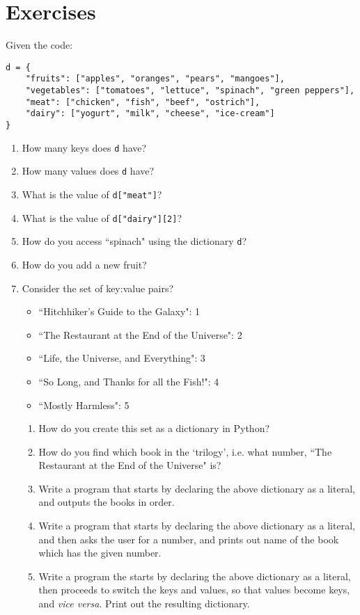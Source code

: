 \section{Exercises}

Given the code:
\begin{lstlisting}
d = {
    "fruits": ["apples", "oranges", "pears", "mangoes"],
    "vegetables": ["tomatoes", "lettuce", "spinach", "green peppers"],
    "meat": ["chicken", "fish", "beef", "ostrich"],
    "dairy": ["yogurt", "milk", "cheese", "ice-cream"]
}\end{lstlisting}
\begin{enumerate}
	\item How many keys does \texttt{d} have?
	\item How many values does \texttt{d} have?
	\item What is the value of 
\texttt{d["meat"]}?
	\item What is the value of 
\texttt{d["dairy"][2]}?
	\item How do you access ``spinach" using the dictionary \texttt{d}?
	\item How do you add a new fruit?
	\item Consider the set of key:value pairs?     
\begin{itemize}
	\item ``Hitchhiker's Guide to the Galaxy": 1
	\item ``The Restaurant at the End of the Universe": 2
	\item ``Life, the Universe, and Everything": 3
	\item ``So Long, and Thanks for all the Fish!": 4
	\item ``Mostly Harmless": 5
\end{itemize}
\begin{enumerate}
	\item How do you create this set as a dictionary in      Python?
	\item How do you find which book in the `trilogy', i.e. what      number, ``The Restaurant at the End of the Universe"      is?
	\item Write a program that starts by declaring the above      dictionary as a literal, and outputs the books in      order.
	\item Write a program that starts by declaring the above      dictionary as a literal, and then asks the user for a      number, and prints out name of the book which has the given      number.
	\item Write a program the starts by declaring the above      dictionary as a literal, then proceeds to switch the keys      and values, so that values become keys, and \textit{vice      versa}.  Print out the resulting dictionary.

\end{enumerate}
\end{enumerate}
